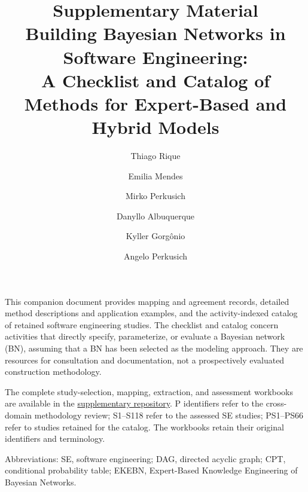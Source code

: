 \documentclass[11pt,a4paper]{article}
\title{Supplementary Material\\[6pt]\large Building Bayesian Networks in Software Engineering:\\A Checklist and Catalog of Methods for Expert-Based and Hybrid Models}
\author{Thiago Rique \and Emilia Mendes \and Mirko Perkusich \and Danyllo Albuquerque \and Kyller Gorg\^onio \and Angelo Perkusich}
\date{}
\begin{document}
\maketitle
This companion document provides mapping and agreement records, detailed method descriptions and application examples, and the activity-indexed catalog of retained software engineering studies. The checklist and catalog concern activities that directly specify, parameterize, or evaluate a Bayesian network (BN), assuming that a BN has been selected as the modeling approach. They are resources for consultation and documentation, not a prospectively evaluated construction methodology.

The complete study-selection, mapping, extraction, and assessment workbooks are available in the \href{https://github.com/mprkc/bn-construction-se}{supplementary repository}. P identifiers refer to the cross-domain methodology review; S1--S118 refer to the assessed SE studies; PS1--PS66 refer to studies retained for the catalog. The workbooks retain their original identifiers and terminology.

Abbreviations: SE, software engineering; DAG, directed acyclic graph; CPT, conditional probability table; EKEBN, Expert-Based Knowledge Engineering of Bayesian Networks.
\tableofcontents
\clearpage

\clearpage



\clearpage

\FloatBarrier


\end{document}
